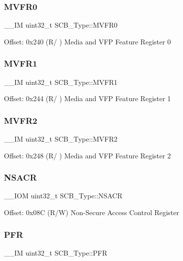 \subsubsection{\texorpdfstring{MVFR0}{MVFR0}}
{\footnotesize\ttfamily \+\_\+\+\_\+\+IM uint32\+\_\+t S\+C\+B\+\_\+\+Type\+::\+M\+V\+F\+R0}

Offset\+: 0x240 (R/ ) Media and V\+FP Feature Register 0 \mbox{\label{struct_s_c_b___type_a75d6299150fdcbbcb765e22ff27c432e}} 
\subsubsection{\texorpdfstring{MVFR1}{MVFR1}}
{\footnotesize\ttfamily \+\_\+\+\_\+\+IM uint32\+\_\+t S\+C\+B\+\_\+\+Type\+::\+M\+V\+F\+R1}

Offset\+: 0x244 (R/ ) Media and V\+FP Feature Register 1 \mbox{\label{struct_s_c_b___type_a280ef961518ecee3ed43a86404853c3d}} 
\subsubsection{\texorpdfstring{MVFR2}{MVFR2}}
{\footnotesize\ttfamily \+\_\+\+\_\+\+IM uint32\+\_\+t S\+C\+B\+\_\+\+Type\+::\+M\+V\+F\+R2}

Offset\+: 0x248 (R/ ) Media and V\+FP Feature Register 2 \mbox{\label{struct_s_c_b___type_a525790dfb9d9e3dd8eb126cdfebcd472}} 
\subsubsection{\texorpdfstring{NSACR}{NSACR}}
{\footnotesize\ttfamily \+\_\+\+\_\+\+I\+OM uint32\+\_\+t S\+C\+B\+\_\+\+Type\+::\+N\+S\+A\+CR}

Offset\+: 0x08C (R/W) Non-\/\+Secure Access Control Register \mbox{\label{struct_s_c_b___type_a40745bb0af880c45827a653222d54117}} 
\subsubsection{\texorpdfstring{PFR}{PFR}}
{\footnotesize\ttfamily \+\_\+\+\_\+\+IM uint32\+\_\+t S\+C\+B\+\_\+\+Type\+::\+P\+FR}

